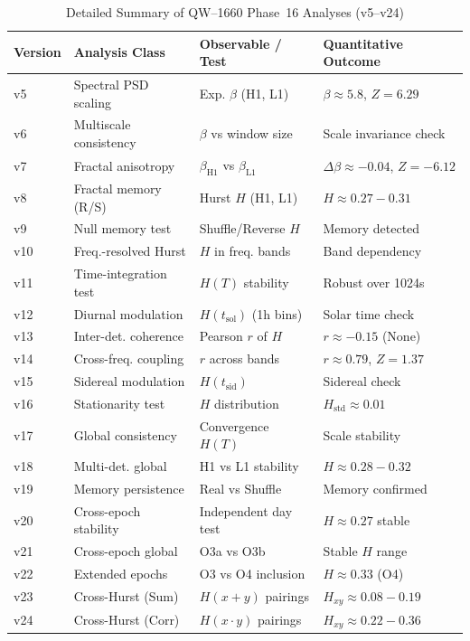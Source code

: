 \documentclass[11pt,a4paper]{book}
\theoremstyle{remark}
\begin{document}
\begin{longtable}{p{1.3cm}p{4.8cm}p{4.5cm}p{3.4cm}}
\caption{Detailed Summary of QW--1660 Phase~16 Analyses (v5--v24)}\label{tab:v5_v24_summary}\\
\toprule
\textbf{Version} & \textbf{Analysis Class} & \textbf{Observable / Test} & \textbf{Quantitative Outcome} \\
\midrule
v5 & Spectral PSD scaling & Exp. $\beta$ (H1, L1) & $\beta \approx 5.8$, $Z=6.29$ \\
v6 & Multiscale consistency & $\beta$ vs window size & Scale invariance check \\
v7 & Fractal anisotropy & $\beta_{\text{H1}}$ vs $\beta_{\text{L1}}$ & $\Delta\beta \approx -0.04$, $Z=-6.12$ \\
v8 & Fractal memory (R/S) & Hurst $H$ (H1, L1) & $H \approx 0.27-0.31$ \\
v9 & Null memory test & Shuffle/Reverse $H$ & Memory detected \\
v10 & Freq.-resolved Hurst & $H$ in freq. bands & Band dependency \\
v11 & Time-integration test & $H(T)$ stability & Robust over 1024s \\
v12 & Diurnal modulation & $H(t_{\text{sol}})$ (1h bins) & Solar time check \\
v13 & Inter-det. coherence & Pearson $r$ of $H$ & $r \approx -0.15$ (None) \\
v14 & Cross-freq. coupling & $r$ across bands & $r \approx 0.79$, $Z=1.37$ \\
v15 & Sidereal modulation & $H(t_{\text{sid}})$ & Sidereal check \\
v16 & Stationarity test & $H$ distribution & $H_{\text{std}} \approx 0.01$ \\
v17 & Global consistency & Convergence $H(T)$ & Scale stability \\
v18 & Multi-det. global & H1 vs L1 stability & $H \approx 0.28-0.32$ \\
v19 & Memory persistence & Real vs Shuffle & Memory confirmed \\
v20 & Cross-epoch stability & Independent day test & $H \approx 0.27$ stable \\
v21 & Cross-epoch global & O3a vs O3b & Stable $H$ range \\
v22 & Extended epochs & O3 vs O4 inclusion & $H \approx 0.33$ (O4) \\
v23 & Cross-Hurst (Sum) & $H(x+y)$ pairings & $H_{xy} \approx 0.08-0.19$ \\
v24 & Cross-Hurst (Corr) & $H(x \cdot y)$ pairings & $H_{xy} \approx 0.22-0.36$ \\
\bottomrule
\end{longtable}
\end{document}
